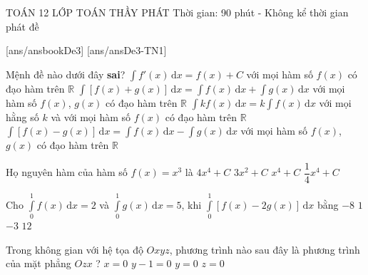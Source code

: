 ﻿\begin{name}
	{\tenchude}
	{TOÁN 12}
	{LỚP TOÁN THẦY PHÁT}
	{Thời gian: 90 phút - Không kể thời gian phát đề}
\end{name}
[ans/ansbookDe3]
\TN
{}[ans/ansDe3-TN1]
\begin{ex}%
Mệnh đề nào dưới đây \textbf{sai}?
\choice
{$\displaystyle\int f'(x)\mathrm{\,d}x=f(x)+C$ với mọi hàm số $f(x)$ có đạo hàm trên $\mathbb{R}$}
{$\displaystyle\int[f(x)+g(x)]\mathrm{\,d}x=\displaystyle\int f(x) \mathrm{\,d}x+\displaystyle\int g(x)\mathrm{\,d}x$ với mọi hàm số $f(x)$, $g(x)$ có đạo hàm trên $\mathbb{R}$}
{\True $\displaystyle\int kf(x)\mathrm{\,d}x=k\displaystyle\int f(x) \mathrm{\,d}x$ với mọi hằng số $k$ và với mọi hàm số $f(x)$ có đạo hàm trên $\mathbb{R}$}
{$\displaystyle\int[f(x)-g(x)]\mathrm{\,d}x=\displaystyle\int f(x) \mathrm{\,d}x-\displaystyle\int g(x)\mathrm{\,d}x$ với mọi hàm số $f(x)$, $g(x)$ có đạo hàm trên $\mathbb{R}$}
\end{ex}

\begin{ex}%
Họ nguyên hàm của hàm số $f(x)=x^3$ là
\choice
{$4x^4+C$}
{$3x^2+C$}
{$x^4+C$}
{\True $\dfrac{1}{4}x^4+C$}
\end{ex}

\begin{ex}%
Cho $\displaystyle\int\limits_0^1f(x)\mathrm{\,d}x=2$ và $\displaystyle\int\limits_0^1g(x)\mathrm{\,d}x=5$, khi $\displaystyle\int\limits_0^1\left[f(x)-2g(x)\right]\mathrm{\,d}x$ bằng
\choice
{\True $-8$}
{$1$}
{$-3$}
{$12$}
\end{ex}

\begin{ex}%
Trong không gian với hệ tọa độ $O x y z$, phương trình nào sau đây là phương trình của mặt phẳng $O z x$ ?
\choice
{$x=0$}
{$y-1=0$}
{\True $y=0$}
{$z=0$}
\end{ex}

